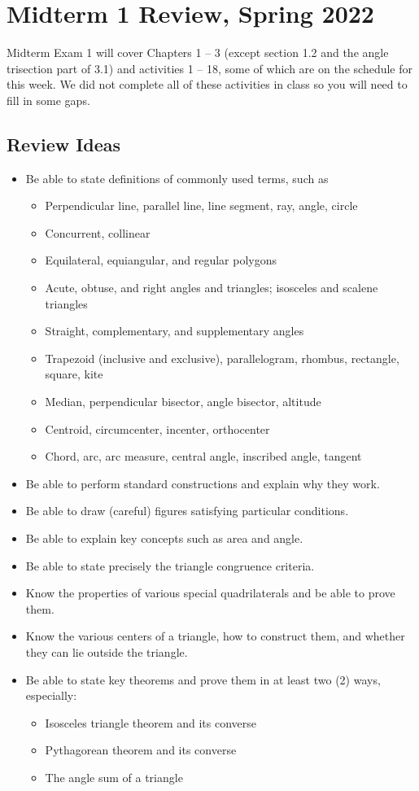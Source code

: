 \newpage

\section{Midterm 1 Review, Spring 2022}
Midterm Exam 1 will cover Chapters 1 -- 3 (except section 1.2 and the angle trisection part of 3.1) and activities 1 -- 18, some of which are on the schedule for this week.  We did not complete all of these activities in class so you will need to fill in some gaps.  
\subsection{Review Ideas}

\begin{itemize}\itemsep0em
\item Be able to state definitions of commonly used terms, such as 
\begin{itemize}
\item Perpendicular line, parallel line, line segment, ray, angle, circle
\item Concurrent, collinear
\item Equilateral, equiangular, and regular polygons
\item Acute, obtuse, and right angles and triangles; isosceles and scalene triangles
\item Straight, complementary, and supplementary angles
\item Trapezoid (inclusive and exclusive), parallelogram, rhombus, rectangle, square, kite
\item Median, perpendicular bisector, angle bisector, altitude
\item Centroid, circumcenter, incenter, orthocenter
\item Chord, arc, arc measure, central angle, inscribed angle, tangent
\end{itemize}
\item Be able to perform standard constructions and explain why they work. 
\item Be able to draw (careful) figures satisfying particular conditions.  
\item Be able to explain key concepts such as area and angle.   
\item Be able to state precisely the triangle congruence criteria. 
\item Know the properties of various special quadrilaterals and be able to prove them.  
\item Know the various centers of a triangle, how to construct them, and whether they can lie outside the triangle.  
\item Be able to state key theorems and prove them in at least two (2) ways, especially:  
\begin{itemize}
\item Isosceles triangle theorem and its converse
\item Pythagorean theorem and its converse
\item The angle sum of a triangle 
\end{itemize}
\end{itemize}


